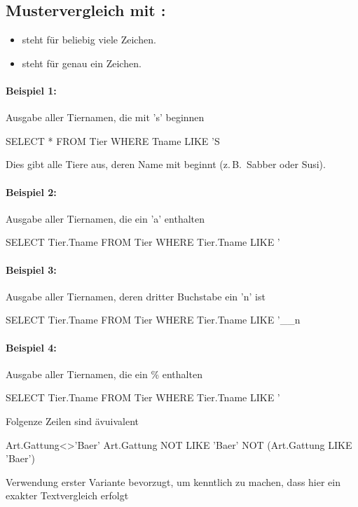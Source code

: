 \subsection{Mustervergleich mit :}
    \begin{itemize}
        \item \rCode{\%} steht für beliebig viele Zeichen.
        \item \rCode{\_} steht für genau ein Zeichen.
    \end{itemize}

    \paragraph{Beispiel 1:} Ausgabe aller Tiernamen, die mit 's' beginnen
    \begin{sql}
    SELECT * 
        FROM Tier
        WHERE Tname LIKE 'S%
    \end{sql}

    Dies gibt alle Tiere aus, deren Name mit  beginnt (z.\,B.\ Sabber oder Susi).

    \paragraph{Beispiel 2:} Ausgabe aller Tiernamen, die ein 'a' enthalten
    \begin{sql}
        SELECT Tier.Tname
            FROM Tier
            WHERE Tier.Tname LIKE '%
    \end{sql}

    \paragraph{Beispiel 3:} Ausgabe aller Tiernamen, deren dritter Buchstabe ein 'n' ist
    \begin{sql}
        SELECT Tier.Tname
            FROM Tier
            WHERE Tier.Tname LIKE '__n%
    \end{sql}

    \paragraph{Beispiel 4:} Ausgabe aller Tiernamen, die ein \% enthalten
    \begin{sql}
        SELECT Tier.Tname
            FROM Tier
            WHERE Tier.Tname LIKE '%
    \end{sql}

    \begin{tcolorbox}[blue={Hinweis}]
        Folgenze Zeilen sind ävuivalent
        \begin{sql}
            Art.Gattung<>'Baer'
            Art.Gattung NOT LIKE 'Baer'
            NOT (Art.Gattung LIKE 'Baer')
        \end{sql}
        Verwendung erster Variante bevorzugt, um kenntlich zu machen, dass hier ein exakter Textvergleich erfolgt
    \end{tcolorbox}

